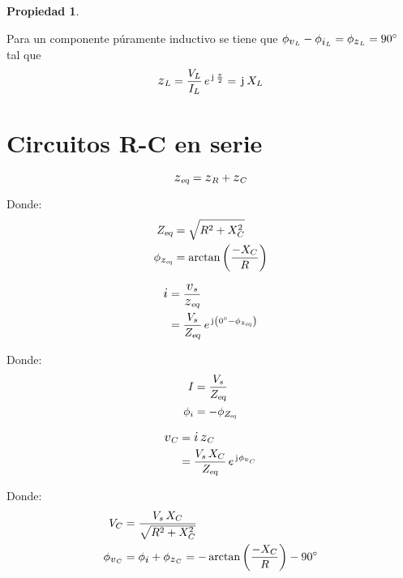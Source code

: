 \documentclass[a5paper,12pt,twoside]{book}
\newtheorem{prop}{{Propiedad}}[chapter]
\begin{document}
\begin{mdframed}[style=MyFrame1]
    \begin{prop}
    \end{prop}
    Para un componente púramente inductivo se tiene que $\phi_{\voltage_L} - \phi_{\current_L} = \phi_{\impedance_L} = \ang{90}$ tal que
    \begin{equation*}
        \impedance_L = \frac{V_L}{I_L} \, e^{\iu \, \frac{\pi}{2}} = \iu \, X_L
    \end{equation*}
\end{mdframed}


\section{Circuitos R-C en serie}

\begin{equation*}
    \sub{\impedance}{eq} = \impedance_R + \impedance_C
\end{equation*}

Donde:
\begin{align*}
    \sub{Z}{eq} &= \sqrt{R^2 + X_C^2}
    \\
    \phi_{\sub{\impedance}{eq}} &= \arctan{\inParentheses{\dfrac{-X_C}{R}}}
\end{align*}

\begin{align*}
    \current &= \frac{\voltage_s}{\sub{\impedance}{eq}}
    \\
    &= \frac{V_s}{\sub{Z}{eq}} \, e^{\iu \inParentheses{\ang{0} - \phi_{\sub{\impedance}{eq}}}}
\end{align*}

Donde:
\begin{align*}
    I &= \frac{V_s}{{{Z}_\textsl{{eq}}}}
    \\
    \phi_i &= - \phi_{{{Z}_\textsl{{eq}}}}
\end{align*}

\begin{align*}
    \voltage_C &= \current \, \impedance_C
    \\
    &= \frac{V_s \, X_C}{\sub{Z}{eq}} \, e^{\iu \phi_{\voltage_C}}
\end{align*}

Donde:
\begin{align*}
    V_C &= \frac{V_s \, X_C}{\sqrt{R^2 + X_C^2}}
    \\
    \phi_{\voltage_C} &= \phi_\current + \phi_{\impedance_C} = - \arctan{\inParentheses{\dfrac{-X_C}{R} }} - \ang{90}
\end{align*}
\end{document}
